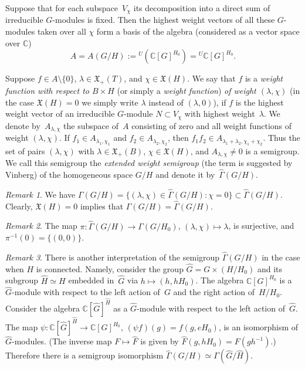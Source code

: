 \documentclass[12pt]{amsart}
\theoremstyle{definition}
\theoremstyle{remark}
\newtheorem{remark}{Remark}
\begin{document}
Suppose that for each subspace~$V_\chi$ its decomposition into a
direct sum of irreducible $G$-modules is fixed. Then the highest
weight vectors of all these $G$-modules taken over all $\chi$ form a
basis of the algebra (considered as a vector space over $\mathbb C$)
$$
A=A(G/H):={}^U(\mathbb{C}[G]^{H_0})={}^U\mathbb{C}[G]^{H_0}.
$$

Suppose $f\in A\setminus\{0\}$, $\lambda\in\mathfrak{X}_+(T)$, and
$\chi\in\mathfrak{X}(H)$. We say that $f$ is a \textit{weight
function with respect to $B\times H$} (or simply a \textit{weight
function}) \textit{of weight $(\lambda,\chi)$} (in the case
$\mathfrak{X}(H)=0$ we simply write $\lambda$ instead of
$(\lambda,0)$), if $f$ is the highest weight vector of an
irreducible $G$-module $N\subset V_\chi$ with highest
weight~$\lambda$. We denote by~$A_{\lambda,\chi}$ the subspace
of~$A$ consisting of zero and all weight functions of weight
$(\lambda,\chi)$. If $f_1\in A_{\lambda_1,\chi_1}$ and $f_2\in
A_{\lambda_2,\chi_2}$, then $f_1f_2 \in
A_{\lambda_1+\lambda_2,\chi_1+\chi_2}$. Thus the set of pairs
$(\lambda,\chi)$ with $\lambda\in\mathfrak{X}_+(B)$,
$\chi\in\mathfrak{X}(H)$, and $A_{\lambda,\chi}\ne0$ is a semigroup.
We call this semigroup the \textit{extended weight semigroup} (the
term is suggested by Vinberg) of the homogeneous space $G/H$ and
denote it by~$\widehat\Gamma(G/H)$.

\begin{remark}
\label{rm1} We have $\Gamma(G/H)=\{(\lambda,\chi) \in
\widehat\Gamma(G/H)\colon \chi=0\} \subset \widehat\Gamma(G/H)$.
Clearly, $\mathfrak{X}(H)=0$ implies that
$\Gamma(G/H)=\widehat\Gamma(G/H)$.
\end{remark}

\begin{remark}
\label{rm2} The map $\pi\colon\widehat\Gamma(G/H)\to\Gamma(G/H_0)$,
$(\lambda,\chi)\mapsto\lambda$, is surjective, and
$\pi^{-1}(0)=\{(0,0)\}$.
\end{remark}

\begin{remark}
\label{rm3} There is another interpretation of the semigroup
$\widehat\Gamma(G/H)$ in the case when $H$ is connected. Namely,
consider the group $\widehat G=G\times (H/H_0)$ and its subgroup
$\widehat H\simeq H$ embedded in~$\widehat G$ via $h\mapsto
(h,hH_0)$. The algebra $\mathbb{C}[G]^{H_0}$ is a $\widehat
G$-module with respect to the left action of~$G$ and the right
action of~$H/H_0$. Consider the algebra $\mathbb{C}[\widehat
G]^{\widehat H}$ as a $\widehat G$-module with respect to the left
action of~$\widehat G$. The map $\psi\colon\mathbb{C}[\widehat
G]^{\widehat H}\to\mathbb{C}[G]^{H_0}$, $(\psi f)(g)=f(g,eH_0)$, is
an isomorphism of $\widehat G$-modules. (The inverse map $F\mapsto
\widehat F$ is given by $\widehat F(g,hH_0)=F(gh^{-1})$.) Therefore
there is a semigroup isomorphism
$\widehat\Gamma(G/H)\simeq\Gamma(\widehat G/\widehat H)$.
\end{remark}
\end{document}
